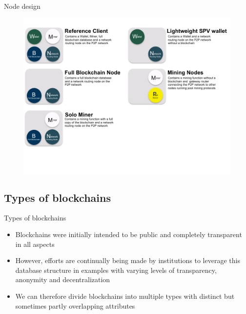 \documentclass[10pt]{beamer}
\begin{document}
\begin{frame}{Node design}
	\begin{figure}[]
		\centering
		\includegraphics  [scale=0.35]{Images/nodes}
	\end{figure}
\end{frame}


\subsection{Types of blockchains}

\begin{frame}{Types of blockchains}
	\begin{itemize}
		\item Blockchains were initially intended to be public and completely transparent in all aspects
		\item However, efforts are continually being made by institutions to leverage this database structure in examples with varying levels of transparency, anonymity and decentralization
		\item We can therefore divide blockchains into multiple types with distinct but sometimes partly overlapping attributes
	\end{itemize}
\end{frame}

\end{document}
